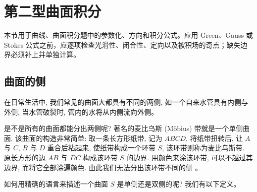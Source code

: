\documentclass[12pt,fontset=fandol]{ctexart}
\begin{document}
\section{第二型曲面积分}\label{course-16-4}
本节用于曲线、曲面积分题中的参数化、方向和积分公式。应用 Green、Gauss 或 Stokes 公式之前，应逐项检查光滑性、闭合性、定向以及被积场的奇点；缺失边界必须补上并单独计算。

\subsection{曲面的侧}

在日常生活中, 我们常见的曲面大都具有不同的两侧, 如一个自来水管具有内侧与外侧, 当水管破裂时, 管内的水将从内侧流向外侧。

是不是所有的曲面都能分出两侧呢? 著名的麦比乌斯 (Möbius) 带就是一个单侧曲面. 该曲面的构造非常简单: 取一条长方形纸带, 记为 $ABCD$, 将纸带扭转后, 让 $A$ 与 $C$, $B$ 与 $D$ 重合后粘起来, 使纸带构成一个环带 $S$, 该环带则称为麦比乌斯带. 原长方形的边 $AB$ 与 $DC$ 构成该环带 $S$ 的边界. 用颜色来涂该环带, 可以不越过其边界, 而将它全部涂遍颜色. 由此我们无法分出该环带不同的侧 。

如何用精确的语言来描述一个曲面 $S$ 是单侧还是双侧的呢? 我们有以下定义。
\end{document}

